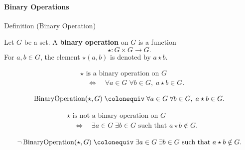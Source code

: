 \paragraph{Binary Operations}




\begin{definitionbox}{Definition (Binary Operation)}
\begin{definition}
\label{def:algebraic-group-binary-operation}
Let $G$ be a set. A \textbf{binary operation} on $G$ is a function
\[
\star : G \times G \to G.
\]
For $a, b \in G$, the element $\star(a,b)$ is denoted by $a \star b$.
\end{definition}
\end{definitionbox}

\begin{remark*}
\[
\begin{aligned}
&\star \text{ is a binary operation on } G \\
&\quad\Longleftrightarrow\quad
\forall a \in G\;\forall b \in G,\; a \star b \in G.
\end{aligned}
\]
\end{remark*}

\begin{remark*}
\[
\operatorname{BinaryOperation}(\star, G)
\;\colonequiv\;
\forall a \in G\;\forall b \in G,\; a \star b \in G.
\]
\end{remark*}

\begin{remark*}
\[
\begin{aligned}
&\star \text{ is not a binary operation on } G \\
&\quad\Longleftrightarrow\quad
\exists a \in G\;\exists b \in G \text{ such that } a \star b \notin G.
\end{aligned}
\]
\end{remark*}

\begin{remark*}
\[
\neg \operatorname{BinaryOperation}(\star, G)
\;\colonequiv\;
\exists a \in G\;\exists b \in G \text{ such that } a \star b \notin G.
\]
\end{remark*}


